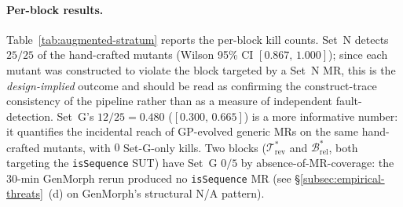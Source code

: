 \paragraph{Per-block results.}
Table~\ref{tab:augmented-stratum} reports the per-block kill counts.
Set~N detects $25/25$ of the hand-crafted mutants
(Wilson 95\% CI $[0.867,\,1.000]$); since each mutant was
constructed to violate the block targeted by a Set~N MR, this is the
\emph{design-implied} outcome and should be read as confirming the
construct-trace consistency of the pipeline rather than as a measure
of independent fault-detection. Set~G's
$12/25 = 0.480$ ($[0.300,\,0.665]$) is a more informative number: it
quantifies the incidental reach of GP-evolved generic MRs on the
same hand-crafted mutants, with $0$ Set-G-only kills. Two blocks
($\mathcal{T}^{*}_{\mathrm{rev}}$ and
$\mathcal{B}^{*}_{\mathrm{rel}}$, both targeting the
\texttt{isSequence} SUT) have Set~G $0/5$ by
absence-of-MR-coverage: the 30-min GenMorph rerun produced no
\texttt{isSequence} MR (see \S\ref{subsec:empirical-threats}~(d) on
GenMorph's structural N/A pattern).

